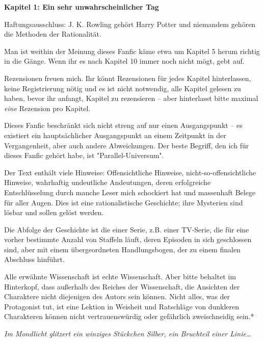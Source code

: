 

\hypertarget{ein-sehr-unwahrscheinlicher-tag}{%

\textbf{Kapitel 1: Ein sehr unwahrscheinlicher Tag}

Haftungsausschluss: J. K. Rowling gehört Harry Potter und niemandem gehören die Methoden der Rationalität.

Man ist weithin der Meinung dieses Fanfic käme etwa um Kapitel 5 herum richtig in die Gänge. Wenn ihr es nach Kapitel 10 immer noch nicht mögt, gebt auf.

Rezensionen freuen mich. Ihr könnt Rezensionen für jedes Kapitel hinterlassen, keine Registrierung nötig und es ist nicht notwendig, alle Kapitel gelesen zu haben, bevor ihr anfangt, Kapitel zu rezensieren -- aber hinterlasst bitte maximal \emph{eine} Rezension pro Kapitel.

Dieses Fanfic beschränkt sich nicht streng auf nur einen Ausgangspunkt -- es existiert ein hauptsächlicher Ausgangspunkt an einem Zeitpunkt in der Vergangenheit, aber auch andere Abweichungen. Der beste Begriff, den ich für dieses Fanfic gehört habe, ist "Parallel-Universum".

Der Text enthält viele Hinweise: Offensichtliche Hinweise, nicht-so-offensichtliche Hinweise, wahrhaftig undeutliche Andeutungen, deren erfolgreiche Entschlüsselung durch manche Leser mich schockiert hat und massenhaft Belege für aller Augen. Dies ist eine rationalistische Geschichte; ihre Mysterien sind lösbar und sollen gelöst werden.

Die Abfolge der Geschichte ist die einer Serie, z.B. einer TV-Serie, die für eine vorher bestimmte Anzahl von Staffeln läuft, deren Episoden in sich geschlossen sind, aber mit einem übergeordneten Handlungsbogen, der zu einem finalen Abschluss hinführt.

Alle erwähnte Wissenschaft ist echte Wissenschaft. Aber bitte behaltet im Hinterkopf, dass außerhalb des Reiches der Wissenschaft, die Ansichten der Charaktere nicht diejenigen des Autors sein können. Nicht alles, was der Protagonist tut, ist eine Lektion in Weisheit und Ratschläge von dunkleren Charakteren können nicht vertrauenswürdig oder gefährlich zweischneidig sein.*

\later

\emph{Im Mondlicht glitzert ein winziges Stückchen Silber, ein Bruchteil einer Linie…}

}
